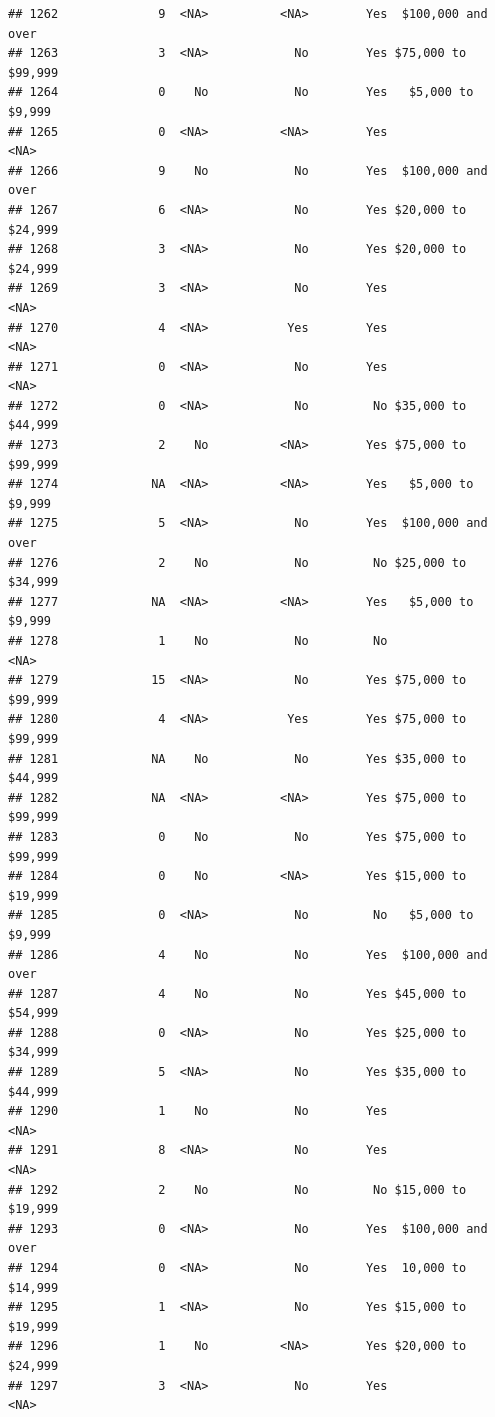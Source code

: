 \documentclass[man]{apa6}
\begin{document}
\begin{verbatim}
## 1262              9  <NA>          <NA>        Yes  $100,000 and over
## 1263              3  <NA>            No        Yes $75,000 to $99,999
## 1264              0    No            No        Yes   $5,000 to $9,999
## 1265              0  <NA>          <NA>        Yes               <NA>
## 1266              9    No            No        Yes  $100,000 and over
## 1267              6  <NA>            No        Yes $20,000 to $24,999
## 1268              3  <NA>            No        Yes $20,000 to $24,999
## 1269              3  <NA>            No        Yes               <NA>
## 1270              4  <NA>           Yes        Yes               <NA>
## 1271              0  <NA>            No        Yes               <NA>
## 1272              0  <NA>            No         No $35,000 to $44,999
## 1273              2    No          <NA>        Yes $75,000 to $99,999
## 1274             NA  <NA>          <NA>        Yes   $5,000 to $9,999
## 1275              5  <NA>            No        Yes  $100,000 and over
## 1276              2    No            No         No $25,000 to $34,999
## 1277             NA  <NA>          <NA>        Yes   $5,000 to $9,999
## 1278              1    No            No         No               <NA>
## 1279             15  <NA>            No        Yes $75,000 to $99,999
## 1280              4  <NA>           Yes        Yes $75,000 to $99,999
## 1281             NA    No            No        Yes $35,000 to $44,999
## 1282             NA  <NA>          <NA>        Yes $75,000 to $99,999
## 1283              0    No            No        Yes $75,000 to $99,999
## 1284              0    No          <NA>        Yes $15,000 to $19,999
## 1285              0  <NA>            No         No   $5,000 to $9,999
## 1286              4    No            No        Yes  $100,000 and over
## 1287              4    No            No        Yes $45,000 to $54,999
## 1288              0  <NA>            No        Yes $25,000 to $34,999
## 1289              5  <NA>            No        Yes $35,000 to $44,999
## 1290              1    No            No        Yes               <NA>
## 1291              8  <NA>            No        Yes               <NA>
## 1292              2    No            No         No $15,000 to $19,999
## 1293              0  <NA>            No        Yes  $100,000 and over
## 1294              0  <NA>            No        Yes  10,000 to $14,999
## 1295              1  <NA>            No        Yes $15,000 to $19,999
## 1296              1    No          <NA>        Yes $20,000 to $24,999
## 1297              3  <NA>            No        Yes               <NA>

\end{verbatim}
\end{document}
